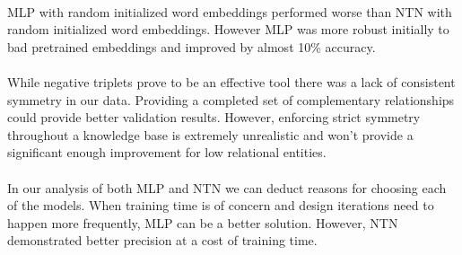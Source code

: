 \documentclass[11.5pt]{article}
\begin{document}
\paragraph{} MLP with random initialized word embeddings performed worse than NTN with random initialized word embeddings. However MLP was more robust initially to bad pretrained embeddings and improved by almost 10\% accuracy. 

\paragraph{} While negative triplets prove to be an effective tool there was a lack of consistent symmetry in our data. Providing a completed set of complementary relationships could provide better validation results. However, enforcing strict symmetry throughout a knowledge base is extremely unrealistic and won't provide a significant enough improvement for low relational entities.

\paragraph{} In our analysis of both MLP and NTN we can deduct reasons for choosing each of the models. When training time is of concern and design iterations need to happen more frequently, MLP can be a better solution. However, NTN demonstrated better precision at a cost of training time.

\pagebreak

{}

\pagebreak
\end{document}
